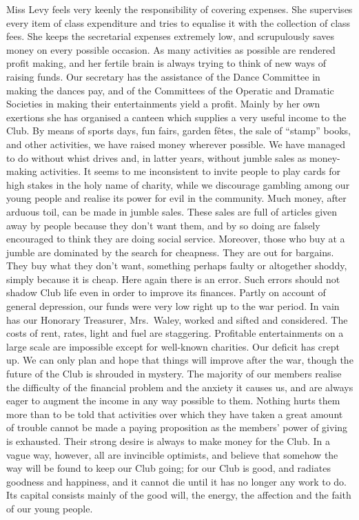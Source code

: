 Miss Levy feels very keenly the responsibility of covering
expenses. She supervises every item of class expenditure
and tries to equalise it with the collection of class
fees. She keeps the secretarial expenses extremely low,
and scrupulously saves money on every possible occasion.
As many activities as possible are rendered profit making,
and her fertile brain is always trying to think of new ways
of raising funds. Our secretary has the assistance of the
Dance Committee in making the dances pay, and of the
Committees of the Operatic and Dramatic Societies in
making their entertainments yield a profit. Mainly by
her own exertions she has organised a canteen which
supplies a very useful income to the Club. By means of
sports days, fun fairs, garden fêtes, the sale of “stamp”
books, and other activities, we have raised money wherever
possible. We have managed to do without whist
drives and, in latter years, without jumble sales as
money-making activities. It seems to me inconsistent to invite
people to play cards for high stakes in the holy name of
charity, while we discourage gambling among our young
people and realise its power for evil in the community.
Much money, after arduous toil, can be made in jumble
sales. These sales are full of articles given away by people
because they don’t want them, and by so doing are falsely
encouraged to think they are doing social service. Moreover,
those who buy at a jumble are dominated by the
search for cheapness. They are out for bargains. They
buy what they don’t want, something perhaps faulty or
altogether shoddy, simply because it is cheap. Here again
there is an error. Such errors should not shadow Club
life even in order to improve its finances.
Partly on account of general depression, our funds were
very low right up to the war period. In vain has our
Honorary Treasurer, Mrs.\ Waley, worked and sifted and
considered. The costs of rent, rates, light and fuel are
staggering. Profitable entertainments on a large scale are
impossible except for well-known charities. Our deficit
has crept up. We can only plan and hope that things will
improve after the war, though the future of the Club is
shrouded in mystery. The majority of our members
realise the difficulty of the financial problem and the
anxiety it causes us, and are always eager to augment the
income in any way possible to them. Nothing hurts them
more than to be told that activities over which they have
taken a great amount of trouble cannot be made a paying
proposition as the members’ power of giving is exhausted.
Their strong desire is always to make money for the
Club. In a vague way, however, all are invincible optimists,
and believe that somehow the way will be found to
keep our Club going; for our Club is good, and radiates
goodness and happiness, and it cannot die until it has no
longer any work to do. Its capital consists mainly of the
good will, the energy, the affection and the faith of our
young people.
